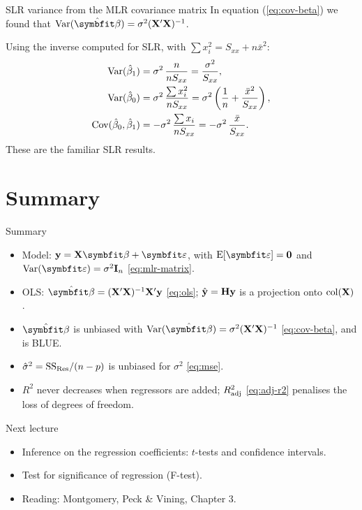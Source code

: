 \begin{frame}{SLR variance from the MLR covariance matrix}
    In equation (\ref{eq:cov-beta}) we found that \(\Var(\hat{\bbeta}) = \sigma^2(\bX'\bX)^{-1}\).

    \svspace{0.5em}

    Using the inverse computed for SLR, with $\sum x_i^2 = S_{xx} + n\bar x^2$:
    \begin{align*}
        \operatorname{Var}(\hat\beta_1) &= \sigma^2\,\frac{n}{nS_{xx}} = \frac{\sigma^2}{S_{xx}}, \\
        \operatorname{Var}(\hat\beta_0) &= \sigma^2\,\frac{\sum x_i^2}{nS_{xx}} = \sigma^2\left(\frac1n + \frac{\bar x^2}{S_{xx}}\right), \\
        \operatorname{Cov}(\hat\beta_0,\hat\beta_1) &= -\sigma^2\,\frac{\sum x_i}{nS_{xx}} = -\sigma^2\,\frac{\bar x}{S_{xx}}.
    \end{align*}
    These are the familiar SLR results.
\end{frame}


\section{Summary}


\begin{frame}{Summary}
    \begin{itemize}
        \item Model: $\by=\bX\bbeta+\bvarepsilon$, with $\E[\bvarepsilon]=\bzero$ and $\Var(\bvarepsilon)=\sigma^2\bI_n$ \eqref{eq:mlr-matrix}.
        \item OLS: $\hat{\bbeta}=(\bX'\bX)^{-1}\bX'\by$ \eqref{eq:ols}; $\hat{\mathbf{y}}=\mathbf{H}\mathbf{y}$ is a projection onto $\operatorname{col}(\mathbf{X})$.
        \item $\hat{\bbeta}$ is unbiased with $\Var(\hat{\bbeta})=\sigma^2(\bX'\bX)^{-1}$ \eqref{eq:cov-beta}, and is BLUE.
        \item $\hat\sigma^2=\mathrm{SS}_{\mathrm{Res}}/(n-p)$ is unbiased for $\sigma^2$ \eqref{eq:mse}.
        \item $R^2$ never decreases when regressors are added; $R^2_{\mathrm{adj}}$ \eqref{eq:adj-r2} penalises the loss of degrees of freedom.
    \end{itemize}
\end{frame}


\begin{frame}{Next lecture}
    \begin{itemize}
        \item Inference on the regression coefficients: $t$-tests and confidence intervals.
        \item Test for significance of regression (F-test).
        \item Reading: Montgomery, Peck \& Vining, Chapter 3.
    \end{itemize}
\end{frame}


